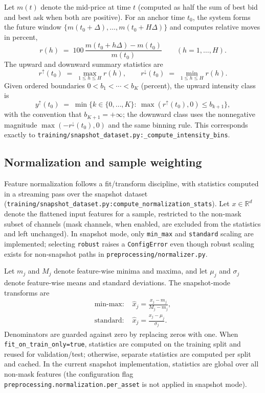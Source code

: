 \documentclass[11pt]{article}
\begin{document}
Let $m(t)$ denote the mid-price at time $t$ (computed as half the sum of best bid and best ask when both are positive). For an anchor time $t_0$, the system forms the future window $\{m(t_0+\Delta), \ldots, m(t_0+H\Delta)\}$ and computes relative moves in percent,
\begin{equation}
  r(h) \;=\; 100\,\frac{m(t_0+h\Delta)-m(t_0)}{m(t_0)} \qquad (h=1,\ldots,H).
\end{equation}
The upward and downward summary statistics are
\begin{equation}
  r^{\uparrow}(t_0) \;=\; \max_{1\le h\le H} r(h), \qquad r^{\downarrow}(t_0) \;=\; \min_{1\le h\le H} r(h).
\end{equation}
Given ordered boundaries $0<b_1<\cdots<b_K$ (percent), the upward intensity class is
\begin{equation}
  y^{\uparrow}(t_0) \;=\; \min\{k\in\{0,\ldots,K\}:\ \max(r^{\uparrow}(t_0),0)\le b_{k+1}\},
\end{equation}
with the convention that $b_{K+1}=+\infty$; the downward class uses the nonnegative magnitude $\max(-r^{\downarrow}(t_0),0)$ and the same binning rule. This corresponds exactly to \texttt{training/snapshot\_dataset.py:\_compute\_intensity\_bins}.

\subsection{Normalization and sample weighting}

Feature normalization follows a fit/transform discipline, with statistics computed in a streaming pass over the snapshot dataset (\texttt{training/snapshot\_dataset.py:compute\_normalization\_stats}). Let $x\in\mathbb{R}^d$ denote the flattened input features for a sample, restricted to the non-mask subset of channels (mask channels, when enabled, are excluded from the statistics and left unchanged). In snapshot mode, only \texttt{min\_max} and \texttt{standard} scaling are implemented; selecting \texttt{robust} raises a \texttt{ConfigError} even though robust scaling exists for non-snapshot paths in \texttt{preprocessing/normalizer.py}.

Let $m_j$ and $M_j$ denote feature-wise minima and maxima, and let $\mu_j$ and $\sigma_j$ denote feature-wise means and standard deviations. The snapshot-mode transforms are
\begin{align}
  \text{min-max: } & \hat{x}_j = \frac{x_j - m_j}{M_j-m_j} ,\\
  \text{standard: } & \hat{x}_j = \frac{x_j - \mu_j}{\sigma_j}.
\end{align}
Denominators are guarded against zero by replacing zeros with one. When \texttt{fit\_on\_train\_only=true}, statistics are computed on the training split and reused for validation/test; otherwise, separate statistics are computed per split and cached. In the current snapshot implementation, statistics are global over all non-mask features (the configuration flag \texttt{preprocessing.normalization.per\_asset} is not applied in snapshot mode).
\end{document}
